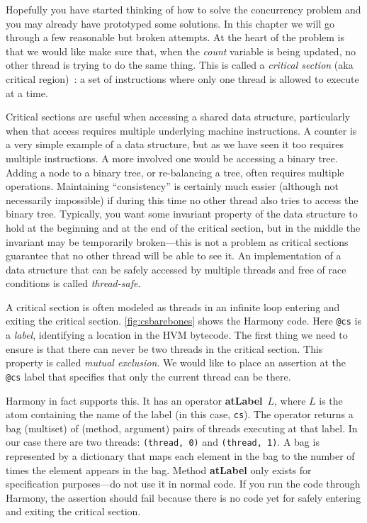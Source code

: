 \documentclass{report}
\begin{document}
Hopefully you have started thinking of how to solve the concurrency
problem and you may already have prototyped some solutions.
In this chapter we will go through a few reasonable but broken attempts.
At the heart of the problem is that we would like make sure that, when
the \textit{count} variable is being updated, no other thread is
trying to do the same thing.  This is called a \emph{critical section}
(aka critical region)~\cite{EWD123}:
a set of instructions where only one thread is allowed to execute at a
time.
%
%

%
%

Critical sections are useful when accessing a shared data
structure, particularly when that access requires multiple underlying
machine instructions.  A counter is a very simple example of
a data structure, but as we have seen it too requires multiple instructions.
A more involved one would be accessing a binary tree.
Adding a node to a binary tree, or re-balancing a tree, often requires
multiple operations.  Maintaining ``consistency'' is certainly much easier
(although not necessarily impossible) if during this time no other
thread also tries to access the binary tree.
Typically, you want some invariant property of the data structure to hold
at the beginning and at the end of the critical section, but in the middle
the invariant may be temporarily broken---this is not a problem as critical
sections guarantee that no other
thread will be able to see it.
An implementation of a data structure that can be safely accessed by multiple
threads and free of race conditions is called \emph{thread-safe}.
%
%

%

A critical section is often modeled as threads in an infinite loop
entering and exiting the critical section.
\autoref{fig:csbarebones} shows the Harmony code.
Here \texttt{@cs} is a \emph{label},
%
identifying a location in the HVM bytecode.  The first thing we need to
ensure is that there can never be two threads in the critical section.
This property is called \emph{mutual exclusion}.
%
We would like to place an assertion at the \texttt{@cs} label that
specifies that only the current thread can be there.

Harmony in fact supports this.
It has an operator \textbf{atLabel}~$L$,
%
where $L$
is the atom containing the name of the label (in this case, \texttt{cs}).
The operator returns a bag (multiset) of (method, argument) pairs of threads
executing at that label.
In our case there are two threads: \texttt{(thread, 0)} and \texttt{(thread, 1)}.
A bag is represented by a dictionary that maps each element
in the bag to the number of times the element appears in the bag.
Method \textbf{atLabel} only exists for specification purposes---do not
use it in normal code.
If you run the code through Harmony, the assertion should fail because
there is no code yet for safely entering and exiting the critical section.
\end{document}
